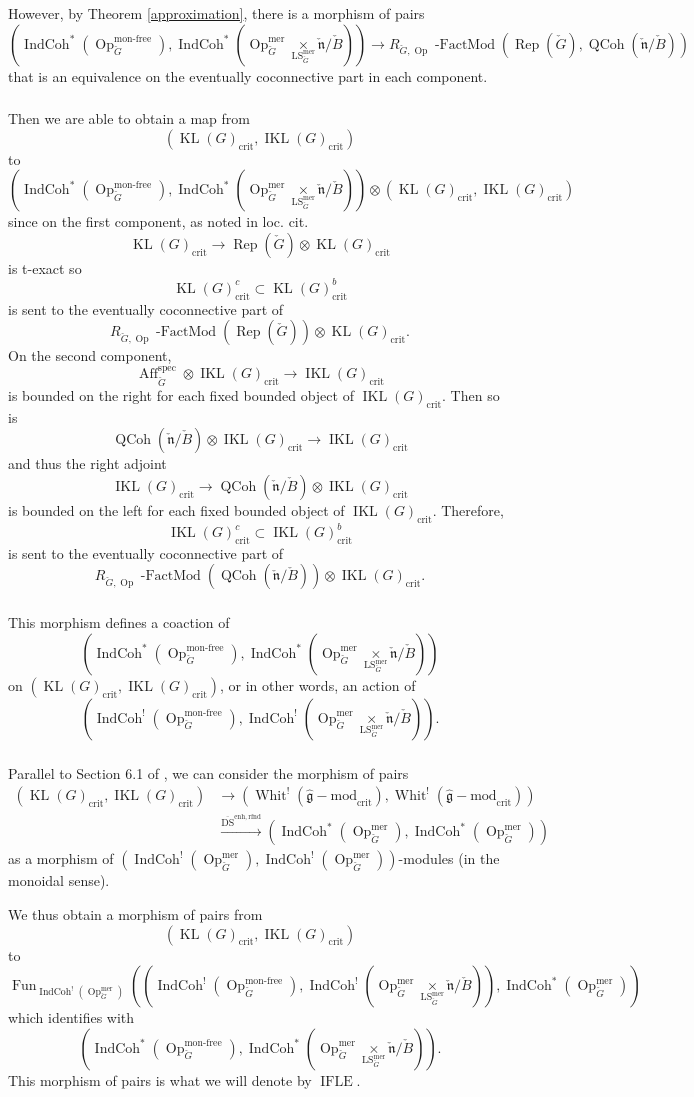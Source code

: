 \documentclass[10pt]{amsart}
\theoremstyle{remark}
\newcommand{\on}[1]{\operatorname{#1}}
\newcommand{\QCoh}{\on{QCoh}}
\newcommand{\IndCoh}{\on{IndCoh}}
\newcommand{\gmod}{\on{\hat{\mathfrak{g}}-mod}}
\newcommand{\KL}{\on{KL}(G)_{\on{crit}}}
\newcommand{\IKL}{\on{IKL}(G)_{\on{crit}}}
\newcommand{\Gcheck}{\check{G}}
\newcommand{\ncheck}{\check{\mathfrak{n}}}
\newcommand{\Bcheck}{\check{B}}
\newcommand{\sssec}[1]{\subsubsection{}}
\begin{document}
However, by Theorem \ref{approximation}, there is a morphism of pairs
$$
(\IndCoh^*(\on{Op}_{\Gcheck}^{\on{mon-free}}), \IndCoh^*(\on{Op}_{\Gcheck}^{\on{mer}} \underset{\on{LS}_{\Gcheck}^{\on{mer}}}{\times} \ncheck/\Bcheck)) \to R_{\Gcheck, \on{Op}}\on{-FactMod}(\on{Rep}(\Gcheck), \QCoh(\ncheck/\Bcheck))
$$
that is an equivalence on the eventually coconnective part in each component.

\sssec{}
Then we are able to obtain a map from
$$
(\KL, \IKL)
$$
to
$$
(\IndCoh^*(\on{Op}_{\Gcheck}^{\on{mon-free}}), \IndCoh^*(\on{Op}_{\Gcheck}^{\on{mer}} \underset{\on{LS}_{\Gcheck}^{\on{mer}}}{\times} \ncheck/\Bcheck)) \otimes (\KL, \IKL)
$$
since on the first component, as noted in loc. cit.
$$
\KL \to \on{Rep}(\Gcheck) \otimes \KL
$$
is t-exact so
$$
\KL^c \subset \KL^b
$$
is sent to the eventually coconnective part of 
$$
R_{\Gcheck, \on{Op}}\on{-FactMod}(\on{Rep}(\Gcheck)) \otimes \KL.
$$
On the second component, 
$$
\on{Aff}_{\Gcheck}^{\on{spec}} \otimes \IKL \to \IKL
$$
is bounded on the right for each fixed bounded object of $\IKL$. Then so is
$$
\QCoh(\ncheck/\Bcheck) \otimes \IKL \to \IKL
$$
and thus the right adjoint
$$
\IKL \to \QCoh(\ncheck/\Bcheck) \otimes \IKL
$$
is bounded on the left for each fixed bounded object of $\IKL$. Therefore, 
$$
\IKL^c \subset \IKL^b
$$
is sent to the eventually coconnective part of 
$$
R_{\Gcheck, \on{Op}}\on{-FactMod}(\QCoh(\ncheck/\Bcheck)) \otimes \IKL.
$$

\sssec{}
This morphism defines a coaction of 
$$
(\IndCoh^*(\on{Op}_{\Gcheck}^{\on{mon-free}}), \IndCoh^*(\on{Op}_{\Gcheck}^{\on{mer}} \underset{\on{LS}_{\Gcheck}^{\on{mer}}}{\times} \ncheck/\Bcheck))
$$
on $(\KL, \IKL)$, or in other words, an action of 
$$
(\IndCoh^!(\on{Op}_{\Gcheck}^{\on{mon-free}}), \IndCoh^!(\on{Op}_{\Gcheck}^{\on{mer}} \underset{\on{LS}_{\Gcheck}^{\on{mer}}}{\times} \ncheck/\Bcheck)).
$$

\sssec{}
Parallel to Section 6.1 of \cite{GLC2}, we can consider the morphism of pairs
\begin{align}
(\KL, \IKL) &\to (\on{Whit}^!(\gmod_{\on{crit}}), \on{Whit}^!(\gmod_{\on{crit}}))  \\&\overset{\on{\overline{DS}^{enh, rfnd}}}{\to} (\IndCoh^*(\on{Op}_{\Gcheck}^{\on{mer}}), \IndCoh^*(\on{Op}_{\Gcheck}^{\on{mer}}))
\end{align}
as a morphism of $(\IndCoh^!(\on{Op}_{\Gcheck}^{\on{mer}}), \IndCoh^!(\on{Op}_{\Gcheck}^{\on{mer}}))$-modules (in the monoidal sense).

We thus obtain a morphism of pairs from
$$
(\KL, \IKL)
$$ 
to
$$
\on{Fun}_{\IndCoh^!(\on{Op}_{\Gcheck}^{\on{mer}})}((\IndCoh^!(\on{Op}_{\Gcheck}^{\on{mon-free}}), \IndCoh^!(\on{Op}_{\Gcheck}^{\on{mer}} \underset{\on{LS}_{\Gcheck}^{\on{mer}}}{\times} \ncheck/\Bcheck)), \IndCoh^*(\on{Op}_{\Gcheck}^{\on{mer}}))
$$
which identifies with
$$
(\IndCoh^*(\on{Op}_{\Gcheck}^{\on{mon-free}}), \IndCoh^*(\on{Op}_{\Gcheck}^{\on{mer}} \underset{\on{LS}_{\Gcheck}^{\on{mer}}}{\times} \ncheck/\Bcheck)).
$$
This morphism of pairs is what we will denote by $\on{IFLE}$.
\end{document}
